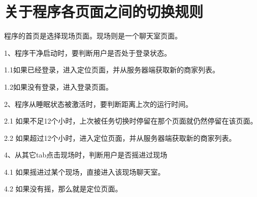\documentclass[cs4size]{ctexartutf8}
\begin{document}
\section{关于程序各页面之间的切换规则}

程序的首页是选择现场页面。现场则是一个聊天室页面。

1、程序干净启动时，要判断用户是否处于登录状态。

1.1如果已经登录，进入定位页面，并从服务器端获取新的商家列表。

1.2如果没有登录，进入登录页面。


2、程序从睡眠状态被激活时，要判断距离上次的运行时间。

2.1 如果不足12个小时，上次被任务切换时停留在那个页面就仍然停留在该页面。

2.2 如果超过12个小时，进入定位页面，并从服务器端获取新的商家列表。



4、从其它tab点击现场时，判断用户是否摇进过现场

4.1 如果摇进过某个现场，直接进入该现场聊天室。

4.2 如果没有摇，那么就是定位页面。




\newpage
\end{document}
